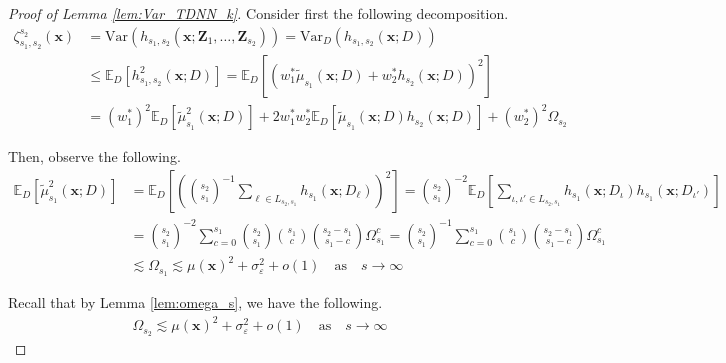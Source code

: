 \documentclass[letterpaper,10pt]{article}
\numberwithin{equation}{section}
\numberwithin{thm}{section}
\numberwithin{lem}{section}
\numberwithin{cor}{section}
\newcommand{\E}{\mathbb{E}}
\newcommand{\1}{\mathbbm{1}}
\newcommand{\Var}{\text{Var}}
\begin{document}
\begin{proof}[Proof of Lemma \ref{lem:Var_TDNN_k}]
	Consider first the following decomposition.
	\begin{equation}
		\begin{aligned}
			\zeta_{s_1, s_2}^{s_2}\left(\mathbf{x}\right)
			 & = \Var\left(h_{s_1, s_2}\left(\mathbf{x}; \mathbf{Z}_1, \ldots, \mathbf{Z}_{s_2}\right)\right)
			= \Var_{D}\left(h_{s_1, s_2}\left(\mathbf{x}; D\right)\right)                                     \\
			 & \leq \E_{D}\left[h_{s_1, s_2}^{2}\left(\mathbf{x}; D\right)\right]
			= \E_{D}\left[
				\left(w_{1}^{*}\tilde{\mu}_{s_1}\left(\mathbf{x}; D\right) + w_{2}^{*} h_{s_2}\left(\mathbf{x}; D\right)\right)^2
			\right]                                                                                           \\
			 & = \left(w_{1}^{*}\right)^2\E_{D}\left[\tilde{\mu}_{s_1}^{2}\left(\mathbf{x}; D\right)\right]
			+ 2 w_{1}^{*}w_{2}^{*} \E_{D}\left[\tilde{\mu}_{s_1}\left(\mathbf{x}; D\right) h_{s_2}\left(\mathbf{x}; D\right)\right]
			+ \left(w_{2}^{*}\right)^2\Omega_{s_2}
		\end{aligned}
	\end{equation}

	Then, observe the following.
	\begin{equation}
		\begin{aligned}
			\E_{D}\left[\tilde{\mu}_{s_1}^{2}\left(\mathbf{x}; D\right)\right]
			 & = \E_D\left[\left(\binom{s_2}{s_1}^{-1}\sum_{\ell \in L_{s_2, s_1}} h_{s_1}\left(\mathbf{x}; D_{\ell}\right)\right)^2\right]
			= \binom{s_2}{s_1}^{-2} \E_{D}\left[\sum_{\iota, \iota' \in L_{s_2, s_1}}h_{s_1}\left(\mathbf{x}; D_{\iota}\right)h_{s_1}\left(\mathbf{x}; D_{\iota'}\right)\right] \\
			 & = \binom{s_2}{s_1}^{-2} \sum_{c = 0}^{s_1} \binom{s_2}{s_1}\binom{s_1}{c}\binom{s_2 - s_1}{s_1 - c} \Omega_{s_1}^{c}
			= \binom{s_2}{s_1}^{-1} \sum_{c = 0}^{s_1} \binom{s_1}{c}\binom{s_2 - s_1}{s_1 - c} \Omega_{s_1}^{c}                                                                \\
			 & \lesssim \Omega_{s_1}
			\lesssim \mu(\mathbf{x})^2 + \sigma_{\varepsilon}^2 + o(1)
			\quad \text{as} \quad s \rightarrow \infty
		\end{aligned}
	\end{equation}

	Recall that by Lemma \ref{lem:omega_s}, we have the following.
	\begin{equation}
		\begin{aligned}
			\Omega_{s_2}
			\lesssim \mu(\mathbf{x})^2 + \sigma_{\varepsilon}^2 + o(1)
			\quad \text{as} \quad s \rightarrow \infty
		\end{aligned}
	\end{equation}


\end{proof}
\end{document}
